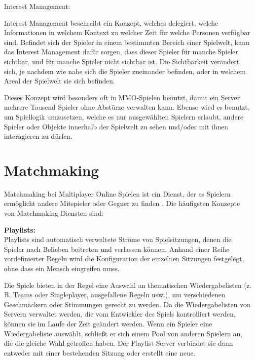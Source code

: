 \textsf{\Large Interest Management:}
\label{interest_management}

Interest Management beschreibt ein Konzept, welches delegiert, welche Informationen in welchem Kontext zu welcher Zeit für welche Personen verfügbar sind. Befindet sich der Spieler in einem bestimmten Bereich einer Spielwelt, kann das Interest Management dafür sorgen, dass dieser Spieler für manche Spieler sichtbar, und für manche Spieler nicht sichtbar ist. Die Sichtbarkeit verändert sich, je nachdem wie nahe sich die Spieler zueinander befinden, oder in welchem Areal der Spielwelt sie sich befinden.

Dieses Konzept wird besonders oft in MMO-Spielen \cite{Wikipedia.2021i} benutzt, damit ein Server mehrere Tausend Spieler ohne Abstürze verwalten kann. Ebenso wird es benutzt, um Spiellogik umzusetzen, welche es nur ausgewählten Spielern erlaubt, andere Spieler oder Objekte innerhalb der Spielwelt zu sehen und/oder mit ihnen interagieren zu dürfen. \cite{Smed.2002c}

\newpage

\section{Matchmaking}

Matchmaking bei Multiplayer Online Spielen ist ein Dienst, der es Spielern ermöglicht andere Mitspieler oder Gegner zu finden \cite{.2014}.  Die häufigsten Konzepte von Matchmaking Diensten sind:

\textbf{Playlists:} \\
Playlists sind automatisch verwaltete Ströme von Spielsitzungen, denen die Spieler nach Belieben beitreten und verlassen können. Anhand einer Reihe vordefinierter Regeln wird die Konfiguration der einzelnen Sitzungen festgelegt, ohne dass ein Mensch eingreifen muss.  

Die Spiele bieten in der Regel eine Auswahl an thematischen Wiedergabelisten (z. B. Teams oder Singleplayer, ausgefallene Regeln usw.), um verschiedenen Geschmäckern oder Stimmungen gerecht zu werden. Da die Wiedergabelisten von Servern verwaltet werden, die vom Entwickler des Spiels kontrolliert werden, können sie im Laufe der Zeit geändert werden. Wenn ein Spieler eine Wiedergabeliste auswählt, schließt er sich einem Pool von anderen Spielern an, die die gleiche Wahl getroffen haben. Der Playlist-Server verbindet sie dann entweder mit einer bestehenden Sitzung oder erstellt eine neue. 

